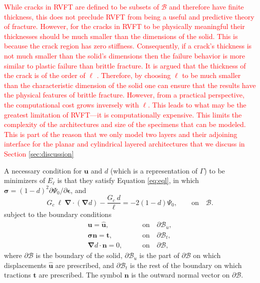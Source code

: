 \documentclass[12pt,onecolumn]{article}
\newcommand{\bs}[1]{\ensuremath{\mathbf{#1}}}
\begin{document}
\begin{bibunit}
\textcolor{red}{While cracks in RVFT are defined to be subsets of $\mathcal{B}$ and therefore have finite thickness, this does not preclude RVFT from being a useful and predictive theory of fracture. However, for the cracks in RVFT to be physically meaningful their thicknesses should be much smaller than the dimensions of the solid. This is because the crack region has zero stiffness. Consequently, if a crack’s thickness is not much smaller than the solid’s dimensions then the failure behavior is more similar to plastic failure than brittle fracture. It is argued that the thickness of the crack is of the order of $\ell$ \cite{amiri2014phase}. Therefore, by choosing $\ell$ to be much smaller than the characteristic dimension of the solid one can ensure that the results have the physical features of brittle fracture. However, from a practical perspective, the computational cost grows inversely with $\ell$. This leads to what may be the greatest limitation of RVFT---it is computationally expensive. This limits the complexity of the architectures and size of the specimens that can be modeled. This is part of the reason that we only model two layers and their adjoining interface for the planar and cylindrical layered architectures that we discuss in Section \ref{sec:discussion}}
 
A necessary condition for $\bs{u}$ and $d$ (which is a representation of $\Gamma$) to be  minimizers of $E_{\ell}$ is that they satisfy Equation \eqref{eq:eql}, in which  $\bm{\sigma}=(1-d)^2\partial\Psi_0/\partial \bm{\epsilon}$, and 
%
\begin{equation}
	G_c ~\ell~ \bm{\nabla} \cdot \left(\bm{\nabla} d\right) -  \frac{G_c~ d}{\ell} = -2(1-d) \Psi_0,  \qquad \text{on} \quad \mathcal{B}. \label{damage_pde}
\end{equation} 
%
subject to the boundary conditions
%
\begin{subequations}\label{Bcs}
	\begin{align}
	\bs{u} = \hat{\bs{u}}, \qquad &\text{on} \quad \partial\mathcal{B}_u,\\
	\bm{\sigma} \bs{n} = \bs{t}, \qquad &\text{on} \quad \partial\mathcal{B}_t,\\
	\bm{\nabla} d \cdot \bs{n} = 0, \qquad &\text{on} \quad \partial\mathcal{B},
	\end{align}
\end{subequations}
%
where $\partial\mathcal{B}$ is the boundary of the solid, $\partial\mathcal{B}_u$ is the part of $\partial\mathcal{B}$ on which displacements $\hat{\bs{u}}$ are prescribed, and $\partial\mathcal{B}_t$ is the rest of the boundary on which tractions $\bs{t}$ are prescribed. The symbol $\bs{n}$ is the outward normal vector on $\partial\mathcal{B}$. 


\end{bibunit}
\end{document}
